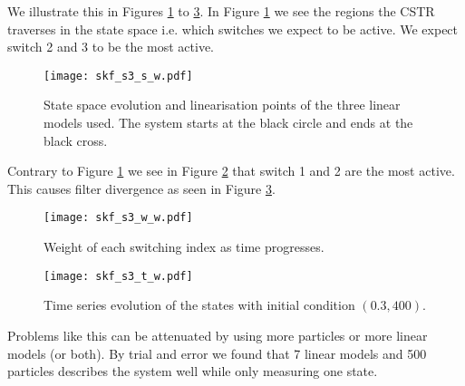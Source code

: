 We illustrate this in Figures \ref{fig_3mod_s_w} to \ref{fig_3mod_t_w}. In Figure \ref{fig_3mod_s_w} we see the regions the CSTR traverses in the state space i.e. which switches we expect to be active. We expect switch 2 and 3 to be the most active.
\begin{figure}[H] 
\centering
\texttt{[image: skf\_s3\_s\_w.pdf]}
\caption{State space evolution and linearisation points of the three linear models used. The system starts at the black circle and ends at the black cross.}
\label{fig_3mod_s_w}
\end{figure}
Contrary to Figure \ref{fig_3mod_s_w} we see in Figure \ref{fig_3mod_w_w} that switch 1 and 2 are the most active. This causes filter divergence as seen in Figure \ref{fig_3mod_t_w}.
\begin{figure}[H] 
\centering
\texttt{[image: skf\_s3\_w\_w.pdf]}
\caption{Weight of each switching index as time progresses.}
\label{fig_3mod_w_w}
\end{figure}
\begin{figure}[H] 
\centering
\texttt{[image: skf\_s3\_t\_w.pdf]}
\caption{Time series evolution of the states with initial condition $(0.3, 400)$.}
\label{fig_3mod_t_w}
\end{figure}
Problems like this can be attenuated by using more particles or more linear models (or both). By trial and error we found that 7 linear models and 500 particles describes the system well while only measuring one state.

